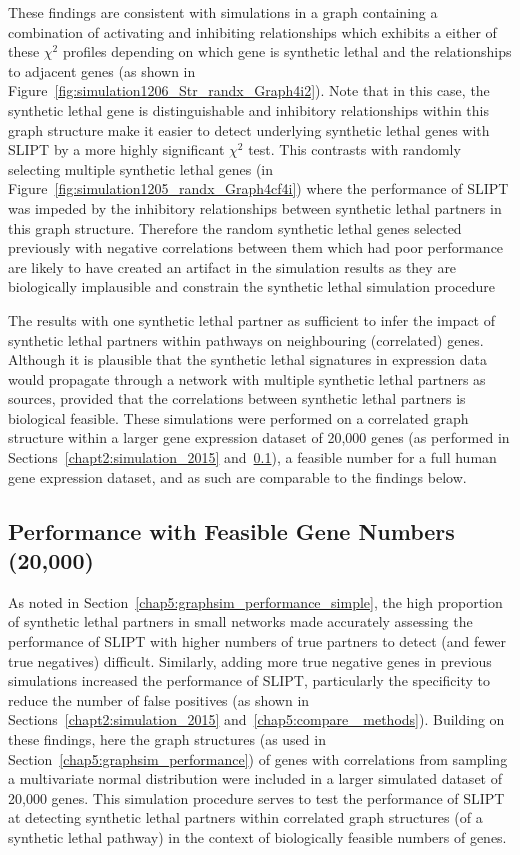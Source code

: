 These findings are consistent with simulations in a graph containing a combination of activating and inhibiting relationships which exhibits a either of these $\chi^2$ profiles depending on which gene is synthetic lethal and the relationships to adjacent genes (as shown in Figure~\ref{fig:simulation1206_Str_randx_Graph4i2}). Note that in this case, the synthetic lethal gene is distinguishable and inhibitory relationships within this graph structure make it easier to detect underlying synthetic lethal genes with \gls{SLIPT} by a more highly significant $\chi^2$ test. This contrasts with randomly selecting multiple synthetic lethal genes (in Figure~\ref{fig:simulation1205_randx_Graph4cf4i}) where the performance of \gls{SLIPT} was impeded by the inhibitory relationships between synthetic lethal partners in this graph structure. Therefore the random synthetic lethal genes selected previously with negative correlations between them which had poor performance are likely to have created an artifact in the simulation results as they are biologically implausible and constrain the synthetic lethal simulation procedure

The results with one synthetic lethal partner as sufficient to infer the impact of synthetic lethal partners within pathways on neighbouring (correlated) genes. Although it is plausible that the synthetic lethal signatures in expression data would propagate through a network with multiple synthetic lethal partners as sources, provided that the correlations between synthetic lethal partners is biological feasible. These simulations were performed on a correlated graph structure within a larger gene expression dataset of 20,000 genes (as performed in Sections~\ref{chapt2:simulation_2015} and~\ref{chap5:graphsim_performance_20K}), a feasible number for a full human gene expression dataset, and as such are comparable to the findings below.

\FloatBarrier

\subsection{Performance with Feasible Gene Numbers (20,000)}
\label{chap5:graphsim_performance_20K}

As noted in Section~\ref{chap5:graphsim_performance_simple}, the high proportion of synthetic lethal partners in small networks made accurately assessing the performance of \gls{SLIPT} with higher numbers of true partners to detect (and fewer true negatives) difficult. Similarly, adding more true negative genes in previous simulations increased the performance of \gls{SLIPT}, particularly the specificity to reduce the number of false positives (as shown in Sections~\ref{chapt2:simulation_2015} and~\ref{chap5:compare_ methods}). Building on these findings, here the graph structures (as used in Section~\ref{chap5:graphsim_performance}) of genes with correlations from sampling a multivariate normal distribution were included in a larger simulated dataset of 20,000 genes. This simulation procedure serves to test the performance of \gls{SLIPT} at detecting synthetic lethal partners within correlated graph structures (of a synthetic lethal pathway) in the context of biologically feasible numbers of genes. 


